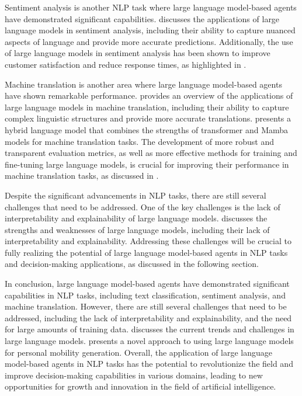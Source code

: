 \documentclass[11pt,a4paper]{article}
\begin{document}
Sentiment analysis is another NLP task where large language model-based agents have demonstrated significant capabilities. \cite{arxiv:2402.06196} discusses the applications of large language models in sentiment analysis, including their ability to capture nuanced aspects of language and provide more accurate predictions. Additionally, the use of large language models in sentiment analysis has been shown to improve customer satisfaction and reduce response times, as highlighted in \cite{doi:10.1109/mnet.2024.3435752}.

Machine translation is another area where large language model-based agents have shown remarkable performance. \cite{arxiv:2402.16142} provides an overview of the applications of large language models in machine translation, including their ability to capture complex linguistic structures and provide more accurate translations. \cite{arxiv:2403.19887} presents a hybrid language model that combines the strengths of transformer and Mamba models for machine translation tasks. The development of more robust and transparent evaluation metrics, as well as more effective methods for training and fine-tuning large language models, is crucial for improving their performance in machine translation tasks, as discussed in \cite{doi:10.1145/3641289}.

Despite the significant advancements in NLP tasks, there are still several challenges that need to be addressed. One of the key challenges is the lack of interpretability and explainability of large language models. \cite{doi:10.1007/s10849-023-09409-x} discusses the strengths and weaknesses of large language models, including their lack of interpretability and explainability. Addressing these challenges will be crucial to fully realizing the potential of large language model-based agents in NLP tasks and decision-making applications, as discussed in the following section.

In conclusion, large language model-based agents have demonstrated significant capabilities in NLP tasks, including text classification, sentiment analysis, and machine translation. However, there are still several challenges that need to be addressed, including the lack of interpretability and explainability, and the need for large amounts of training data. \cite{doi:10.3390/app14052074} discusses the current trends and challenges in large language models. \cite{arxiv:2402.14744} presents a novel approach to using large language models for personal mobility generation. Overall, the application of large language model-based agents in NLP tasks has the potential to revolutionize the field and improve decision-making capabilities in various domains, leading to new opportunities for growth and innovation in the field of artificial intelligence.
\end{document}
